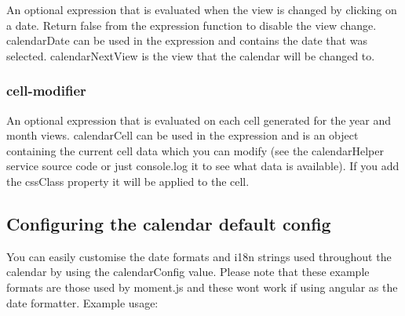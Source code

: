 An optional expression that is evaluated when the view is changed by clicking on a date. Return false from the expression function to disable the view change. {\ttfamily calendar\+Date} can be used in the expression and contains the date that was selected. {\ttfamily calendar\+Next\+View} is the view that the calendar will be changed to.

\subsubsection*{cell-\/modifier}

An optional expression that is evaluated on each cell generated for the year and month views. {\ttfamily calendar\+Cell} can be used in the expression and is an object containing the current cell data which you can modify (see the {\ttfamily calendar\+Helper} service source code or just console.\+log it to see what data is available). If you add the {\ttfamily css\+Class} property it will be applied to the cell.

\subsection*{Configuring the calendar default config}

You can easily customise the date formats and i18n strings used throughout the calendar by using the {\ttfamily calendar\+Config} value. Please note that these example formats are those used by moment.\+js and these won\textquotesingle{}t work if using angular as the date formatter. Example usage\+:


